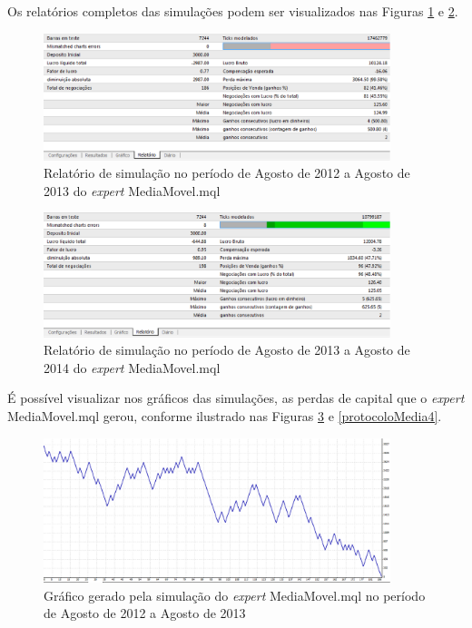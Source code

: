 Os relatórios completos das simulações podem ser visualizados nas Figuras \ref{protocoloMedia} e \ref{protocoloMedia2}.

\begin{figure}[H]
\centering
\includegraphics[width=0.9\textwidth]{figuras/protocoloMedia}
\caption{Relatório de simulação no período de Agosto de 2012 a Agosto de 2013 do \textit{expert} MediaMovel.mql} 
\label{protocoloMedia}
\end{figure}

\begin{figure}[H]
\centering
\includegraphics[width=0.9\textwidth]{figuras/protocoloMedia2}
\caption{Relatório de simulação no período de Agosto de 2013 a Agosto de 2014 do \textit{expert} MediaMovel.mql} 
\label{protocoloMedia2}
\end{figure}

É possível visualizar nos gráficos das simulações, as perdas de capital que o \textit{expert} MediaMovel.mql gerou, conforme ilustrado nas Figuras \ref{protocoloMedia3} e \ref{protocoloMedia4}.

\begin{figure}[H]
\centering
\includegraphics[width=0.9\textwidth]{figuras/protocoloMedia3}
\caption{ Gráfico gerado pela simulação do \textit{expert} MediaMovel.mql no período de Agosto de 2012 a Agosto de 2013} 
\label{protocoloMedia3}
\end{figure}

